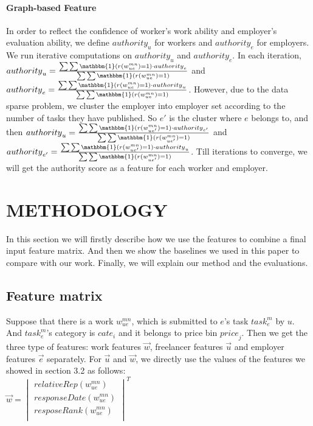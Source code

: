 \documentclass{sig-alternate-05-2015}
\begin{document}
\paragraph{Graph-based Feature}
In order to reflect the confidence of worker's work ability and employer's evaluation ability, we define ${authority}_{u}$ for workers and ${authority}_{e}$ for employers.  We run iterative computations on ${authority}_{u}$ and ${authority}_{e}$. In each iteration, ${authority}_{u}=\frac{\sum{\sum{\mathbbm{1}(r({w}_{ue}^{mn})=1)}\cdot{authority}_{e}}}{\sum{\sum{\mathbbm{1}(r({w}_{ue}^{mn})=1)}}}$ and ${authority}_{e}=\frac{\sum{\sum{\mathbbm{1}(r({w}_{ue}^{mn})=1)\cdot}{authority}_{u}}}{\sum{\sum{\mathbbm{1}(r({w}_{ue}^{mn})=1)}}}$. However, due to the data sparse problem, we cluster the employer into employer set according to the number of tasks they have published. So $e'$ is the cluster where $e$ belongs to, and then ${authority}_{u}=\frac{\sum{\sum{\mathbbm{1}(r({w}_{ue'}^{mn})=1)}\cdot{authority}_{e'}}}{\sum{\sum{\mathbbm{1}(r({w}_{ue'}^{mn})=1)}}}$ and ${authority}_{e'}=\frac{\sum{\sum{\mathbbm{1}(r({w}_{ue'}^{mn})=1)\cdot}{authority}_{u}}}{\sum{\sum{\mathbbm{1}(r({w}_{ue'}^{mn})=1)}}}$. Till iterations to converge, we will get the authority score as a feature for each worker and employer.


\section{METHODOLOGY}
In this section we will firstly describe how we use the features to combine a final input feature matrix. And then we show the baselines we used in this paper to compare with our work. Finally, we will explain our method and the evaluations.
\subsection{Feature matrix}
Suppose that there is a work ${w}_{ue}^{mn}$, which is submitted to $e$'s task ${task}_{e}^{m}$ by $u$. And ${task}_{e}^{m}$'s category is ${cate}_{i}$ and it belongs to price bin ${price}_{j}$. Then we get the three type of features: work features $\vec{w}$, freelancer features $\vec{u}$ and employer features $\vec{e}$ separately. For $\vec{u}$ and $\vec{w}$, we directly use the values of the features we showed in section 3.2 as follows:\\
$\vec{w}={\begin{vmatrix} 
relativeRep({w}_{ue}^{mn})\\ 
responseDate({w}_{ue}^{mn})\\ 
resposeRank({w}_{ue}^{mn})\\
\end{vmatrix} }^{ T }$
\end{document}

